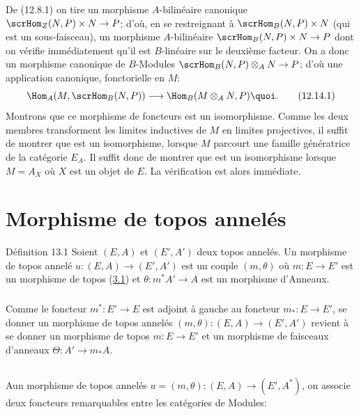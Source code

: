 \noindent De (12.8.1) on tire un morphisme $A$-bilinéaire
canonique $\scrHom_Z(N,P)\times N\rightarrow P$; d'où, en se
restreignant à $\scrHom_B(N,P)\times N$ (qui est un sous-faisceau),
un morphisme $A$-bilinéaire $\scrHom_B(N,P)\times N\rightarrow P$
dont on vérifie immédiatement qu'il est $B$-linéaire sur
le deuxième
facteur. On a donc un morphisme canonique de $B$-Modules
$\scrHom_B(N,P)\otimes_A N\rightarrow P$; d'où une application
canonique, fonctorielle en $M$:
\begin{equation*}
\Hom_A(M,\scrHom_B(N,P))\longrightarrow \Hom_B (M\otimes_A
N,P){\quoi}.\tag{12.14.1}
\end{equation*}
Montrons que ce morphisme de foncteurs est un isomorphisme. Comme
les deux membres transforment les limites inductives de $M$ en
limites projectives, il suffit de montrer que  est un
isomorphisme, lorsque $M$ parcourt une famille génératrice de la
catégorie $E_A$. Il suffit donc de montrer que  est
un isomorphisme lorsque $M=A_X$ où $X$ est un objet de $E$. La
vérification est alors immédiate.


\section{Morphisme de topos annelés}

\begin{enonce*}{Définition 13.1}
Soient $(E,A)$ et $(E',A')$ deux topos annelés. Un morphisme de
topos annelé $u:(E,A)\rightarrow (E',A')$ est un couple $(m,\theta)$
où $m:E\rightarrow E'$ est un morphisme de topos {\rm
(\hyperref[IV.def3.1]{3.1})} et $\theta:m^{\ast}A'\rightarrow A$ est un
morphisme d'Anneaux.
\end{enonce*}

\setcounter{subsection}{1}
\subsubsection{}
Comme le foncteur $m^{\ast}:E'\rightarrow E$ est adjoint à gauche au
foncteur $m_{\ast}:E\rightarrow E'$, se donner un morphisme de topos
annelés $(m,\theta):(E,A)\rightarrow (E',A')$ revient à se donner un
morphisme de topos $m:E\rightarrow E'$ et un morphisme de faisceaux
d'anneaux $\Theta:A'\rightarrow m_{\ast}A$.

\subsection{}
A\pageoriginale un morphisme de topos annelés
$u=(m,\theta):(E,A)\rightarrow (E',A^{\ast})$, on associe deux
foncteurs remarquables entre les catégories de Modules:

